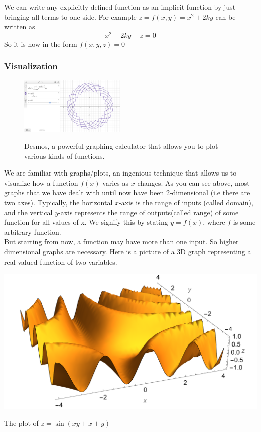 \documentclass[14pt]{article}
\begin{document}
	We can write any explicitly defined function as an implicit function by just bringing all terms to one side. For example $z=f(x,y)= x^2 + 2ky$ can be written as 
	\begin{equation*}
		x^2 + 2ky - z = 0
	\end{equation*}
	So it is now in the form $f(x, y, z) = 0$
	
	\subsubsection{Visualization}
	\begin{figure}
		\centering
		\includegraphics[width=0.45\textwidth]{desmos_advertisement_lol}
		
		\footnotesize \raggedright Desmos, a powerful graphing calculator that allows you to plot various kinds of functions.
	\end{figure}
	We are familiar with graphs/plots, an ingenious technique that allows us to visualize how a function $f(x)$ varies as $x$ changes. As you can see above, most graphs that we have dealt with until now have been 2-dimensional (i.e there are two axes). Typically, the horizontal $x$-axis is the range of inputs (called domain), and the vertical $y$-axis represents the range of outputs(called range) of some function for all values of x. We signify this by stating $y = f(x)$, where $f$ is some arbitrary function.\\[1em]
	But starting from now, a function may have more than one input. So higher dimensional graphs are necessary. Here is a picture of a 3D graph representing a real valued function of two variables. 
	\begin{center}
		\includegraphics[width=15cm]{3d-graph_1}
		
		\footnotesize The plot of $z = \sin(xy + x + y)$
	\end{center}
\end{document}
